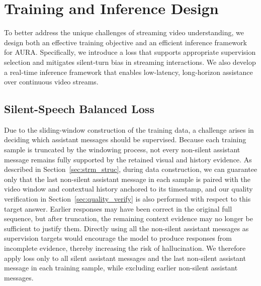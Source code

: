 \section{Training and Inference Design}

To better address the unique challenges of streaming video understanding, we design both an effective training objective and an efficient inference framework for AURA. Specifically, we introduce a loss that supports appropriate supervision selection and mitigates silent-turn bias in streaming interactions. We also develop a real-time inference framework that enables low-latency, long-horizon assistance over continuous video streams.

\subsection{Silent-Speech Balanced Loss}\label{silent-speech_balanced_loss}

Due to the sliding-window construction of the training data, a challenge arises in deciding which assistant messages should be supervised. Because each training sample is truncated by the windowing process, not every non-silent assistant message remains fully supported by the retained visual and history evidence. As described in Section~\ref{sec:strm_struc}, during data construction, we can guarantee only that the last non-silent assistant message in each sample is paired with the video window and contextual history anchored to its timestamp, and our quality verification in Section~\ref{sec:quality_verify} is also performed with respect to this target answer. Earlier responses may have been correct in the original full sequence, but after truncation, the remaining context evidence may no longer be sufficient to justify them. Directly using all the non-silent assistant messages as supervision targets would encourage the model to produce responses from incomplete evidence, thereby increasing the risk of hallucination. We therefore apply loss only to all silent assistant messages and the last non-silent assistant message in each training sample, while excluding earlier non-silent assistant messages.

